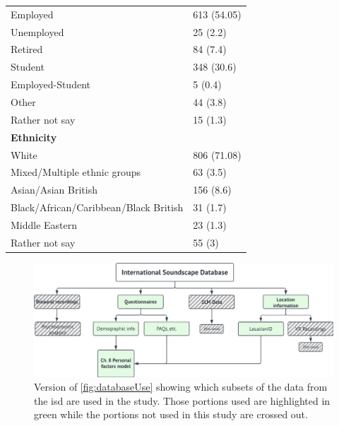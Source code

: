 \begin{table}[!ht]
\begin{tabular}{@{}ll@{}}
    \quad Employed                              & 613 (54.05)             \\
    \quad Unemployed                            & 25  (2.2)               \\
    \quad Retired                               & 84  (7.4)               \\
    \quad Student                               & 348 (30.6)              \\
    \quad Employed-Student                      & 5   (0.4)               \\
    \quad Other                                 & 44  (3.8)               \\
    \quad Rather not say                        & 15  (1.3)               \\
    \textbf{Ethnicity}                          &                         \\
    \quad White                                 & 806 (71.08)             \\
    \quad Mixed/Multiple ethnic groups          & 63  (3.5)               \\
    \quad Asian/Asian British                   & 156 (8.6)               \\
    \quad Black/African/Caribbean/Black British & 31  (1.7)               \\
    \quad Middle Eastern                        & 23  (1.3)               \\
    \quad Rather not say                        & 55  (3)                 \\
    \bottomrule
  \end{tabular}%
\end{table}

\begin{figure}[h]
  \centering
  \includegraphics[width=\textwidth]{Figures/Database use figure - Chap 8.png}
  \caption{Version of \cref{fig:databaseUse} showing which subsets of the data from the \gls{isd} are used in the study. Those portions used are highlighted in green while the portions not used in this study are crossed out. \label{fig:databaseUse8}}
\end{figure}

